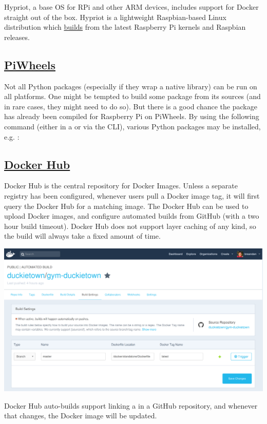 Hypriot, a base OS for RPi and other ARM devices, includes support for Docker straight out of the box. Hypriot is a lightweight Raspbian-based Linux distribution which \href{https://github.com/hypriot/image-builder-rpi}{builds} from the latest Raspberry Pi kernels and Raspbian releases.

\subsection{\href{https://www.piwheels.org/}{PiWheels}}

Not all Python packages (especially if they wrap a native library) can be run on all platforms. One might be tempted to build some package from its sources (and in rare cases, they might need to do so). But there is a good chance the package has already been compiled for Raspberry Pi on PiWheels. By using the following command (either in a  or via the CLI), various Python packages may be installed, e.g. :
%

\subsection{\href{https://hub.docker.com/}{Docker Hub}}\label{subsec:docker_hub}

Docker Hub is the central repository for Docker Images. Unless a separate registry has been configured, whenever users pull a Docker image tag, it will first query the Docker Hub for a matching image. The Docker Hub can be used to upload Docker images, and configure automated builds from GitHub (with a two hour build timeout). Docker Hub does not support layer caching of any kind, so the build will always take a fixed amount of time.\vspace{10pt}
%
\begin{centering}
\includegraphics[width=\textwidth]{../figures/docker_hub_autobuild.png}
\end{centering}
%
Docker Hub auto-builds support linking a  in a GitHub repository, and whenever that  changes, the Docker image will be updated.

